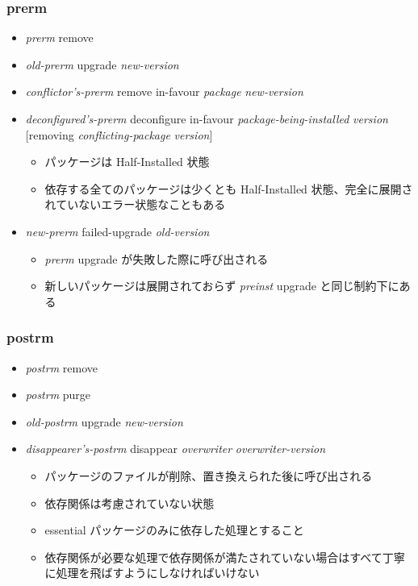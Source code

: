 \documentclass[mingoth,a4paper]{jsarticle}
\begin{document}
\subsubsection{prerm}

\begin{itemize}
\item {\it prerm} remove
\item {\it old-prerm} upgrade {\it new-version}
\item {\it conflictor's-prerm} remove in-favour {\it package} {\it new-version}
\item {\it deconfigured's-prerm} deconfigure in-favour {\it package-being-installed} {\it version} [removing {\it conflicting-package} {\it version}]
  \begin{itemize}
  \item パッケージは Half-Installed 状態
  \item 依存する全てのパッケージは少くとも Half-Installed 状態、完全に展開されていないエラー状態なこともある
  \end{itemize}
\end{itemize}

\begin{itemize}
\item {\it new-prerm} failed-upgrade {\it old-version}
  \begin{itemize}
  \item {\it prerm} upgrade が失敗した際に呼び出される
  \item 新しいパッケージは展開されておらず {\it preinst} upgrade と同じ制約下にある
  \end{itemize}
\end{itemize}


\subsubsection{postrm}

\begin{itemize}
\item {\it postrm} remove
\item {\it postrm} purge
\item {\it old-postrm} upgrade {\it new-version}
\item {\it disappearer's-postrm} disappear {\it overwriter} {\it overwriter-version}
  \begin{itemize}
  \item パッケージのファイルが削除、置き換えられた後に呼び出される
  \item 依存関係は考慮されていない状態
  \item essential パッケージのみに依存した処理とすること
  \item 依存関係が必要な処理で依存関係が満たされていない場合はすべて丁寧に処理を飛ばすようにしなければいけない
  \end{itemize}
\end{itemize}
\end{document}
